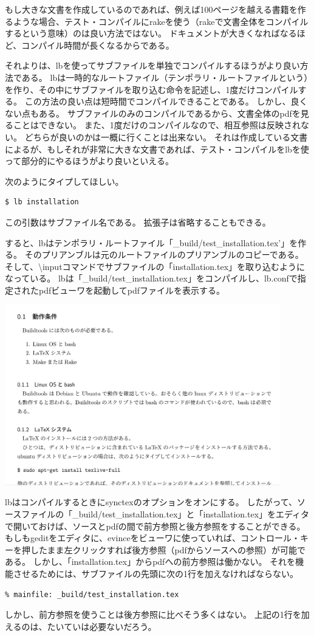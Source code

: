 もし大きな文書を作成しているのであれば、例えば100ページを越える書籍を作るような場合、テスト・コンパイルにrakeを使う（rakeで文書全体をコンパイルするという意味）のは良い方法ではない。
ドキュメントが大きくなればなるほど、コンパイル時間が長くなるからである。

それよりは、lbを使ってサブファイルを単独でコンパイルするほうがより良い方法である。
lbは一時的なルートファイル（テンポラリ・ルートファイルという）を作り、その中にサブファイルを取り込む命令を記述し、1度だけコンパイルする。
この方法の良い点は短時間でコンパイルできることである。
しかし、良くない点もある。
サブファイルのみのコンパイルであるから、文書全体のpdfを見ることはできない。
また、1度だけのコンパイルなので、相互参照は反映されない。
どちらが良いのかは一概に行くことは出来ない。
それは作成している文書によるが、もしそれが非常に大きな文書であれば、テスト・コンパイルをlbを使って部分的にやるほうがより良いといえる。

次のようにタイプしてほしい。
\begin{verbatim}
$ lb installation
\end{verbatim}
この引数はサブファイル名である。
拡張子は省略することもできる。

すると、lbはテンポラリ・ルートファイル「\_build/test\_installation.tex'」を作る。
そのプリアンブルは元のルートファイルのプリアンブルのコピーである。
そして、{\textbackslash}inputコマンドでサブファイルの「installation.tex」を取り込むようになっている。
lbは「\_build/test\_installation.tex」をコンパイルし、lb.confで指定されたpdfビューワを起動してpdfファイルを表示する。
\begin{center}
\includegraphics[width=12cm]{test_installation.png}
\end{center}

lbはコンパイルするときにsynctexのオプションをオンにする。
したがって、ソースファイルの「\_build/test\_installation.tex」と「installation.tex」をエディタで開いておけば、ソースとpdfの間で前方参照と後方参照をすることができる。
もしもgeditをエディタに、evinceをビューワに使っていれば、コントロール・キーを押したまま左クリックすれば後方参照（pdfからソースへの参照）が可能である。
しかし、「installation.tex」からpdfへの前方参照は働かない。
それを機能させるためには、サブファイルの先頭に次の1行を加えなければならない。
\begin{verbatim}
% mainfile: _build/test_installation.tex
\end{verbatim}
しかし、前方参照を使うことは後方参照に比べそう多くはない。
上記の1行を加えるのは、たいていは必要ないだろう。

